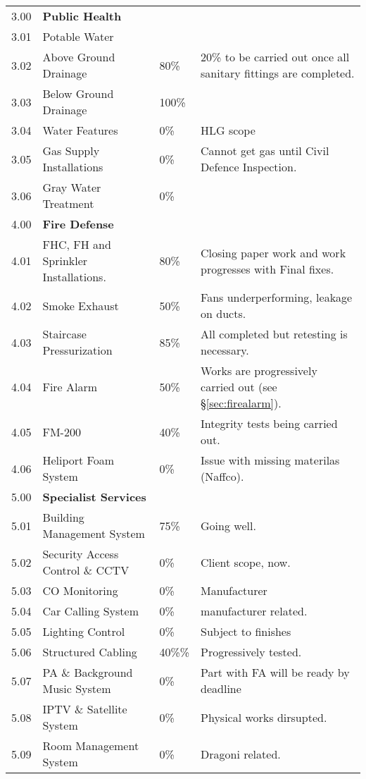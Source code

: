 \begin{longtable}{lllp{4.3cm}@{}}
\midrule
3.00	&\textbf{Public Health}		&&\\
3.01	&Potable Water	&&\\	
3.02	&Above Ground Drainage &80\%&20\% to be carried out once all sanitary fittings are completed.\\		
3.03	&Below Ground Drainage  &100\%&\\		
3.04	&Water Features	     &0\%& HLG scope\\	
3.05	&Gas Supply Installations	&0\%& Cannot get gas until Civil Defence Inspection.\\	
3.06  & Gray Water Treatment &0\% &    \\
\midrule		
4.00	&\textbf{Fire Defense} &&\\	
4.01	&FHC, FH and Sprinkler Installations.	&80\%&Closing paper work and work progresses with Final fixes.\\	
4.02	&Smoke Exhaust		&50\%&Fans underperforming, leakage on ducts. \\
4.03	&Staircase Pressurization          &85\%&All completed but retesting is necessary.\\		
4.04	&Fire Alarm		&50\%& Works are progressively carried out (see \S\ref{sec:firealarm}).\\
4.05	&FM-200		&40\%&Integrity tests being carried out.\\
4.06	&Heliport Foam System	 &0\%&Issue with missing materilas (Naffco).\\	
\midrule
5.00	&\textbf{Specialist Services}		&&\\
5.01	&Building Management System	&75\%& Going well.\\	
5.02	&Security Access Control \& CCTV	&0\%&Client scope, now.\\	
5.03	&CO Monitoring		& 0\%&Manufacturer \\
5.04	&Car Calling System		&0\%&manufacturer related.\\
5.05	&Lighting Control		&0\%&Subject to finishes\\
5.06	&Structured Cabling		&40\%\%&Progressively tested.\\
5.07	&PA \& Background Music System &0\%&Part with FA will be ready by deadline\\		
5.08	&IPTV \& Satellite System	&0\%&Physical works dirsupted.\\	
5.09	&Room Management System	&0\%&Dragoni related.\\

\bottomrule
\end{longtable}

